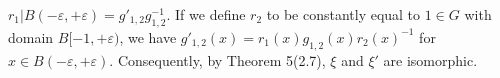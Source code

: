 $r_1 | B(-\varepsilon, +\varepsilon) = g'_{1,2} g_{1,2}^{-1}$. If we define $r_2$ to be constantly equal to $1 \in G$ with domain $B[-1, +\varepsilon)$, we have $g'_{1,2}(x) = r_1(x) g_{1,2}(x) r_2(x)^{-1}$ for $x \in B(-\varepsilon, +\varepsilon)$. Consequently, by Theorem 5(2.7), $\xi$ and $\xi'$ are isomorphic.
